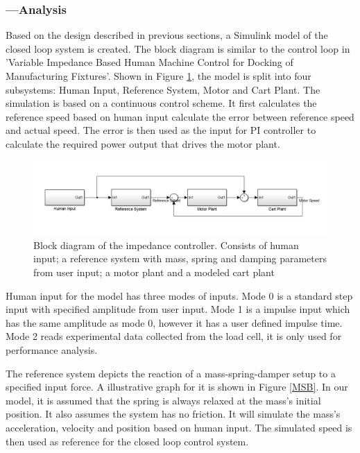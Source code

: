 \subsubsection*{ ---Analysis}
Based on the design described in previous sections, a Simulink model of the closed loop system is created. The block diagram is similar to the control loop in 'Variable Impedance Based Human Machine Control for Docking of Manufacturing Fixtures'\cite{toni}. Shown in Figure \ref{fig:ControlLoop}, the model is split into four subsystems: Human Input, Reference System, Motor and Cart Plant. The simulation is based on a continuous control scheme. It first calculates the reference speed based on human input calculate the error between reference speed and actual speed. The error is then used as the input for PI controller to calculate the required power output that drives the motor plant.

\begin{figure}[ht]
\centering
\includegraphics[width=1\linewidth]{Images/ControlLoop}
\caption{Block diagram of the impedance controller. Consists of human input; a reference system with mass, spring and damping parameters from user input; a motor plant and a modeled cart plant}
\label{fig:ControlLoop}
\end{figure}

Human input for the model has three modes of inputs. Mode 0 is a standard step input with specified amplitude from user input. Mode 1 is a impulse input which has the same amplitude as mode 0, however it has a user defined impulse time. Mode 2 reads experimental data collected from the load cell, it is only used for performance analysis.

The reference system depicts the reaction of a mass-spring-damper setup to a specified input force. A illustrative graph for it is shown in Figure \ref{MSB}. In our model, it is assumed that the spring is always relaxed at the mass's initial position. It also assumes the system has no friction. It will simulate the mass's acceleration, velocity and position based on human input. The simulated speed is then used as reference for the closed loop control system.

